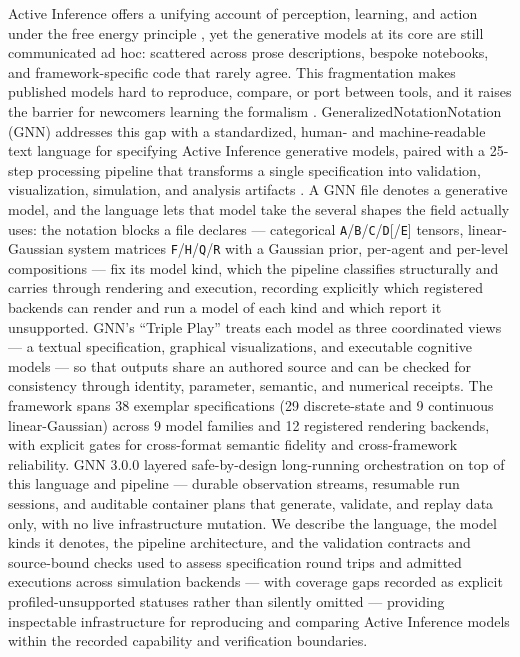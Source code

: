 \documentclass[
  english,
  9pt,
]{extarticle}
\begin{document}
Active Inference offers a unifying account of perception, learning, and
action under the free energy principle \citep{friston2010}, yet the
generative models at its core are still communicated ad hoc: scattered
across prose descriptions, bespoke notebooks, and framework-specific
code that rarely agree. This fragmentation makes published models hard
to reproduce, compare, or port between tools, and it raises the barrier
for newcomers learning the formalism \citep{parr2022}.
GeneralizedNotationNotation (GNN) addresses this gap with a
standardized, human- and machine-readable text language for specifying
Active Inference generative models, paired with a 25-step processing
pipeline that transforms a single specification into validation,
visualization, simulation, and analysis artifacts \citep{gnn2023}. A GNN
file denotes a generative model, and the language lets that model take
the several shapes the field actually uses: the notation blocks a file
declares --- categorical
\texttt{A}/\texttt{B}/\texttt{C}/\texttt{D}{[}/\texttt{E}{]} tensors,
linear-Gaussian system matrices
\texttt{F}/\texttt{H}/\texttt{Q}/\texttt{R} with a Gaussian prior,
per-agent and per-level compositions --- fix its model kind, which the
pipeline classifies structurally and carries through rendering and
execution, recording explicitly which registered backends can render and
run a model of each kind and which report it unsupported. GNN's ``Triple
Play'' treats each model as three coordinated views --- a textual
specification, graphical visualizations, and executable cognitive models
--- so that outputs share an authored source and can be checked for
consistency through identity, parameter, semantic, and numerical
receipts. The framework spans 38 exemplar specifications (29
discrete-state and 9 continuous linear-Gaussian) across 9 model families
and 12 registered rendering backends, with explicit gates for
cross-format semantic fidelity and cross-framework reliability. GNN
3.0.0 layered safe-by-design long-running orchestration on top of this
language and pipeline --- durable observation streams, resumable run
sessions, and auditable container plans that generate, validate, and
replay data only, with no live infrastructure mutation. We describe the
language, the model kinds it denotes, the pipeline architecture, and the
validation contracts and source-bound checks used to assess
specification round trips and admitted executions across simulation
backends --- with coverage gaps recorded as explicit
profiled-unsupported statuses rather than silently omitted --- providing
inspectable infrastructure for reproducing and comparing Active
Inference models within the recorded capability and verification
boundaries.
\end{document}
